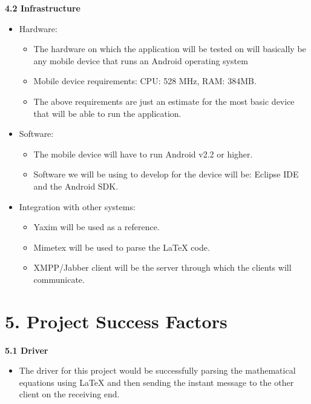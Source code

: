 \documentclass[29pt,a4paper]{moderncv}
\begin{document}
\newpage
		\noindent \textbf{4.2 Infrastructure}
		\vspace{4mm}
			\begin{itemize}
				\item Hardware:
				\begin{itemize}
					\item The hardware on which the application will be tested on will basically be any mobile device that runs an Android operating system
					\item Mobile device requirements: CPU: 528 MHz, RAM: 384MB.
					\item The above requirements are just an estimate for the most basic device that will be able to run the application.
				\end{itemize}
				
				\item Software:
				\begin{itemize}
					\item The mobile device will have to run Android v2.2 or higher.
					\item Software we will be using to develop for the device will be: Eclipse IDE and the Android SDK.
				\end{itemize}
								
				\item Integration with other systems:
				\begin{itemize}
					\item Yaxim will be used as a reference.
					\item Mimetex will be used to parse the LaTeX code.
					\item XMPP/Jabber client will be the server through which the clients will communicate.
				\end{itemize}
			\end{itemize}
		\vspace{5mm}

		
	\section*{\textbf{5. Project Success Factors}}
	\vspace{4mm}
	
		\noindent \textbf{5.1 Driver}
		\vspace{4mm}
			\begin{itemize}
				\item The driver for this project would be successfully parsing the mathematical equations using LaTeX and then sending the instant message to the other client on the receiving end.
			\end{itemize}
			\vspace{5mm}
		
\end{document}
